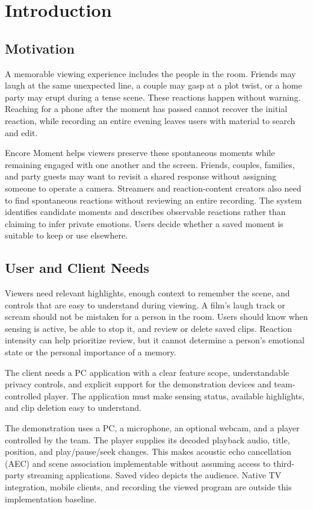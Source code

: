 \section{Introduction}
\subsection{Motivation}
A memorable viewing experience includes the people in the room. Friends may laugh at the same unexpected line, a couple may gasp at a plot twist, or a home party may erupt during a tense scene. These reactions happen without warning. Reaching for a phone after the moment has passed cannot recover the initial reaction, while recording an entire evening leaves users with material to search and edit.

Encore Moment helps viewers preserve these spontaneous moments while remaining engaged with one another and the screen. Friends, couples, families, and party guests may want to revisit a shared response without assigning someone to operate a camera. Streamers and reaction-content creators also need to find spontaneous reactions without reviewing an entire recording. The system identifies candidate moments and describes observable reactions rather than claiming to infer private emotions. Users decide whether a saved moment is suitable to keep or use elsewhere.

\subsection{User and Client Needs}
Viewers need relevant highlights, enough context to remember the scene, and controls that are easy to understand during viewing. A film's laugh track or scream should not be mistaken for a person in the room. Users should know when sensing is active, be able to stop it, and review or delete saved clips. Reaction intensity can help prioritize review, but it cannot determine a person's emotional state or the personal importance of a memory.

The client needs a PC application with a clear feature scope, understandable privacy controls, and explicit support for the demonstration devices and team-controlled player. The application must make sensing status, available highlights, and clip deletion easy to understand.

The demonstration uses a PC, a microphone, an optional webcam, and a player controlled by the team. The player supplies its decoded playback audio, title, position, and play/pause/seek changes. This makes acoustic echo cancellation (AEC) and scene association implementable without assuming access to third-party streaming applications. Saved video depicts the audience. Native TV integration, mobile clients, and recording the viewed program are outside this implementation baseline.

